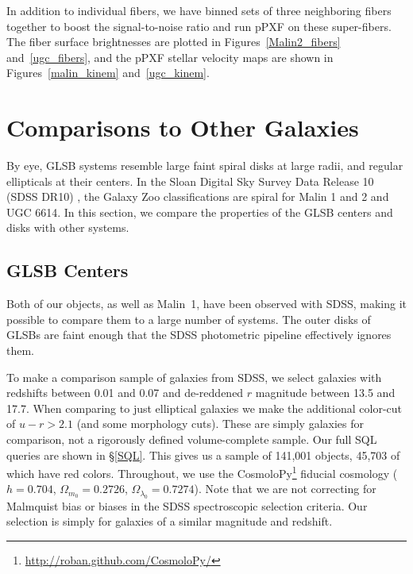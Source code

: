 \documentclass{emulateapj}
\def\arcsec{$^{\prime\prime}$}
\begin{document}
In addition to individual fibers, we have binned sets of three neighboring fibers together to boost the signal-to-noise ratio and run pPXF on these super-fibers. The fiber surface brightnesses are plotted in Figures~\ref{Malin2_fibers} and~\ref{ugc_fibers}, and the pPXF stellar velocity maps are shown in Figures~\ref{malin_kinem} and~\ref{ugc_kinem}.






\section{Comparisons to Other Galaxies}

By eye, GLSB systems resemble large faint spiral disks at large radii, and regular ellipticals at their centers.  In the Sloan Digital Sky Survey Data Release 10 (SDSS DR10) \citep{Ahn14}, the Galaxy Zoo classifications \citep{Willett13} are spiral for Malin 1 and 2 and UGC 6614.  In this section, we compare the properties of the GLSB centers and disks with other systems.  

\subsection{GLSB Centers}\label{sec:centers}

Both of our objects, as well as Malin~1, have been observed with SDSS, making it possible to compare them to a large number of systems.  The outer disks of GLSBs are faint enough that the SDSS photometric pipeline effectively ignores them.  

To make a comparison sample of galaxies from SDSS, we select galaxies with redshifts between 0.01 and 0.07 and de-reddened $r$ magnitude between 13.5 and 17.7.  When comparing to just elliptical galaxies we make the additional color-cut of $u-r > 2.1$ (and some morphology cuts).  These are simply galaxies for comparison, not a rigorously defined volume-complete sample.  Our full SQL queries are shown in \S\ref{SQL}.  This gives us a sample of 141,001 objects, 45,703 of which have red colors.  Throughout, we use the CosmoloPy\footnote{\url{http://roban.github.com/CosmoloPy/}} fiducial cosmology ($h=0.704$, $\Omega_{m_0}=0.2726$, $\Omega_{\lambda_0}=0.7274$).  Note that we are not correcting for Malmquist bias or biases in the SDSS spectroscopic selection criteria.  Our selection is simply for galaxies of a similar magnitude and redshift.  
\end{document}
